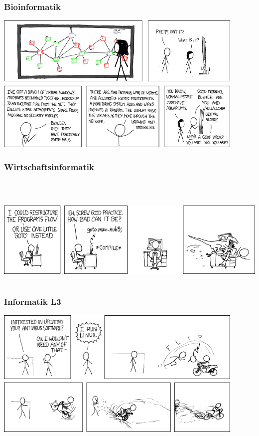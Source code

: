 \documentclass[12pt,a4paper]{scrartcl}
\begin{document}
	\subsubsection{Bioinformatik}
    	

    \begin{center}
        \includegraphics[width=0.9\textwidth]{comics/network.png}
    \end{center}

	\subsubsection{Wirtschaftsinformatik}
    \\
    \begin{center}
        \includegraphics[height=4.5cm]{comics/goto.png}
    \end{center}
\newpage
	\subsubsection{Informatik L3}
	
    \begin{center}
        \includegraphics[width=0.9\textwidth]{comics/linux_user_at_best_buy.png}
    \end{center}
\newpage
\end{document}
